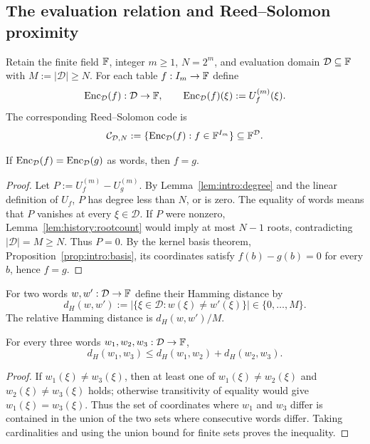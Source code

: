 \subsection{The evaluation relation and Reed--Solomon proximity}\label{sec:security:relations}

\begin{definition}\label{def:security:encoding}
Retain the finite field $\mathbb{F}$, integer $m\geq1$, $N=2^m$, and evaluation domain $\mathcal D\subseteq\mathbb{F}$ with $M:=|\mathcal D|\geq N$. For each table $f:I_m\to\mathbb{F}$ define
\begin{equation}\label{eq:security:encoding}
 \operatorname{Enc}_\mathcal D(f):\mathcal D\to\mathbb{F},\qquad
 \operatorname{Enc}_\mathcal D(f)(\xi):=U_f^{(m)}(\xi).
\end{equation}
The corresponding Reed--Solomon code is
\[
 \mathcal C_{\mathcal D,N}
 :=\{\operatorname{Enc}_\mathcal D(f):f\in\mathbb{F}^{I_m}\}
 \subseteq\mathbb{F}^\mathcal D.
\]
\end{definition}

\begin{lemma}\label{lem:security:encoding-injective}
If $\operatorname{Enc}_\mathcal D(f)=\operatorname{Enc}_\mathcal D(g)$ as words, then $f=g$.
\end{lemma}
\begin{proof}
Let $P:=U_f^{(m)}-U_g^{(m)}$. By Lemma~\ref{lem:intro:degree} and the linear definition of $U_f$, $P$ has degree less than $N$, or is zero. The equality of words means that $P$ vanishes at every $\xi\in\mathcal D$. If $P$ were nonzero, Lemma~\ref{lem:history:rootcount} would imply at most $N-1$ roots, contradicting $|\mathcal D|=M\geq N$. Thus $P=0$. By the kernel basis theorem, Proposition~\ref{prop:intro:basis}, its coordinates satisfy $f(b)-g(b)=0$ for every $b$, hence $f=g$.
\end{proof}

\begin{definition}\label{def:security:hamming}
For two words $w,w':\mathcal D\to\mathbb{F}$ define their Hamming distance by
\[
 d_H(w,w'):=\bigl|\{\xi\in\mathcal D:w(\xi)\neq w'(\xi)\}\bigr|
       \in\{0,\ldots,M\}.
\]
The relative Hamming distance is $d_H(w,w')/M$.
\end{definition}

\begin{lemma}\label{lem:security:hamming-triangle}
For every three words $w_1,w_2,w_3:\mathcal D\to\mathbb{F}$,
\[
 d_H(w_1,w_3)\leq d_H(w_1,w_2)+d_H(w_2,w_3).
\]
\end{lemma}
\begin{proof}
If $w_1(\xi)\neq w_3(\xi)$, then at least one of
$w_1(\xi)\neq w_2(\xi)$ and $w_2(\xi)\neq w_3(\xi)$ holds; otherwise transitivity of equality would give $w_1(\xi)=w_3(\xi)$. Thus the set of coordinates where $w_1$ and $w_3$ differ is contained in the union of the two sets where consecutive words differ. Taking cardinalities and using the union bound for finite sets proves the inequality.
\end{proof}

